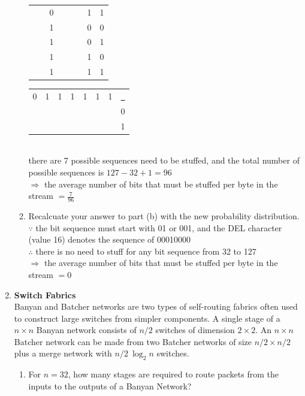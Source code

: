 \documentclass[10pt, a4paper]{article}
\begin{document}
\begin{enumerate}
\begin{enumerate}
\begin{tabular}[t]{cccccccc}
              & & 0 & & & & 1 & 1\\
              & & 1 & & & & 0 & 0\\
              & & 1 & & & & 0 & 1\\
              & & 1 & & & & 1 & 0\\
              & & 1 & & & & 1 & 1\\
        \end{tabular}\qquad
        \begin{tabular}[t]{cccccccc}
            0 & 1 & 1 & 1 & 1 & 1 & 1 & \underline{\ }\\
              & & & & & & & 0\\
              & & & & & & & 1\\
        \end{tabular}\\
        there are 7 possible sequences need to be stuffed, and the total number of possible sequences is $127 - 32 + 1 = 96$\\
        $\Rightarrow$ the average number of bits that must be stuffed per byte in the stream $= \frac{7}{96}$
        \color{black}
    \item Recalcuate your answer to part (b) with the new probability distribution.\\
        \color{blue}
        $\because$ the bit sequence must start with 01 or 001, and the DEL character (value 16) denotes the sequence of 00010000\\
        $\therefore$ there is no need to stuff for any bit sequence from 32 to 127\\
        $\Rightarrow$ the average number of bits that must be stuffed per byte in the stream $= 0$
        \color{black}
    \end{enumerate}
\item\mbox{}\textbf{Switch Fabrics}\\
    Banyan and Batcher networks are two types of self-routing fabrics often used to construct large switches from simpler components. A single stage of a $n \times n$ Banyan network consists of $n / 2$ switches of dimension $2 \times 2$. An $n \times n$ Batcher network can be made from two Batcher networks of size $n / 2 \times n / 2$ plus a merge network with $n / 2\  \log_2 n$ switches.
    \begin{enumerate}
    \item For $n = 32$, how many stages are required to route packets from the inputs to the outputs of a Banyan Network?\\

\end{enumerate}
\end{enumerate}
\end{document}
